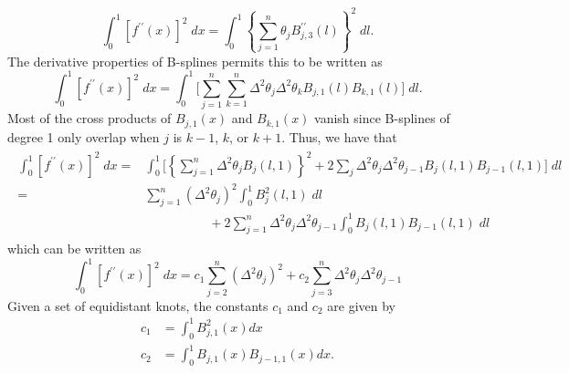 \begin{equation*} 
\int_0^1 \left[ f^{\prime \prime}\left(x\right)\right]^2\;dx = \int_{0}^{1} \left\{ \sum\limits_{j=1}^n  \theta_j B_{j,3}^{\prime \prime} \left(l\right) \right\}^2\; dl.
\end{equation*}
\noindent
The derivative properties of B-splines permits this to be written as 
\begin{equation*} \label{eq:second-derivative-bspline-penalty}
\int_0^1 \left[ f^{\prime \prime}\left(x\right)\right]^2\;dx =  \int_{0}^{1}  \bigg[ \sum\limits_{j=1}^n \sum\limits_{k=1}^n \Delta^2 \theta_j \Delta^2 \theta_k B_{j,1}\left(l\right)B_{k,1}\left(l\right)\bigg]\; dl  . 
\end{equation*}
\noindent
Most of the cross products of $B_{j,1}\left(x\right)$ and $B_{k,1}\left( x \right)$ vanish since B-splines of degree 1 only overlap when $j$ is $k-1$, $k$, or $k+1$. Thus, we have that
\begin{align}
\begin{split}
\int_0^1 \left[ f^{\prime \prime}\left(x\right)\right]^2\;dx  = {} &  \int_0^1 \bigg[ \left\{ \sum\limits_{j=1}^n   \Delta^2 \theta_j  B_j\left(l,1\right)  \right\}^2  + 2 \sum_{j}\Delta^2 \theta_j\Delta^2 \theta_{j-1}B_j\left(l,1\right)B_{j-1}\left(l,1\right) \bigg]\; dl \\ 
= {} & \sum \limits_{j=1}^n  \left( \Delta^2\theta_j \right)^2 \int_0^1 B_j^2\left(l,1\right)\;dl \\
   &{} \;\;\;\;\;\;\;\;\;\;\;\;\;\;\;\;\;\; + 2 \sum\limits_{j=1}^n \Delta^2 \theta_j\Delta^2 \theta_{j-1} \int_0^1 B_j\left(l,1\right)B_{j-1}\left(l,1\right)\;dl 
\end{split}
\end{align}
\noindent
which can be written as
\begin{equation} \label{eq:derivative-penalty-difference-penalty-connection}
\int_0^1 \left[ f^{\prime \prime}\left(x\right)\right]^2\;dx  = c_1 \sum\limits_{j=2}^n \left( \Delta^2 \theta_j\right)^2 + c_2 \sum\limits_{j=3}^n \Delta^2 \theta_j\Delta^2 \theta_{j-1}
\end{equation}
\noindent
Given a set of equidistant knots, the constants $c_1$ and $c_2$ are given by
\begin{equation}
\begin{split}
c_1 & =   \int_0^1 B_{j,1}^2\left(x\right) dx\\
c_2 & = \int_0^1 B_{j,1}\left(x\right)B_{j-1,1}\left(x\right) dx.
\end{split}
\end{equation}

